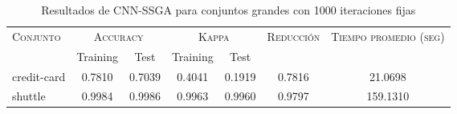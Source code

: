 \begin{table}[]
\centering
\begin{tabular}{l c c c c c c}
\hline
\multirow{2}{*}{\textsc{Conjunto}}
	& \multicolumn{2}{c}{\textsc{Accuracy}}
	& \multicolumn{2}{c}{\textsc{Kappa}}
	& \textsc{Reducción}
	& \textsc{Tiempo promedio (seg)} \\
	& Training & Test
	& Training & Test \\ 
\hline
\hline

credit-card & 0.7810 & 0.7039 & 0.4041 & 0.1919 & 0.7816 & 21.0698 \\
shuttle & 0.9984 & 0.9986 & 0.9963 & 0.9960 & 0.9797 & 159.1310 \\

\hline
\end{tabular}
\caption{Resultados de CNN-SSGA para conjuntos grandes con 1000 iteraciones fijas}
\label{res-grande-cnn-ssga}
\end{table}


